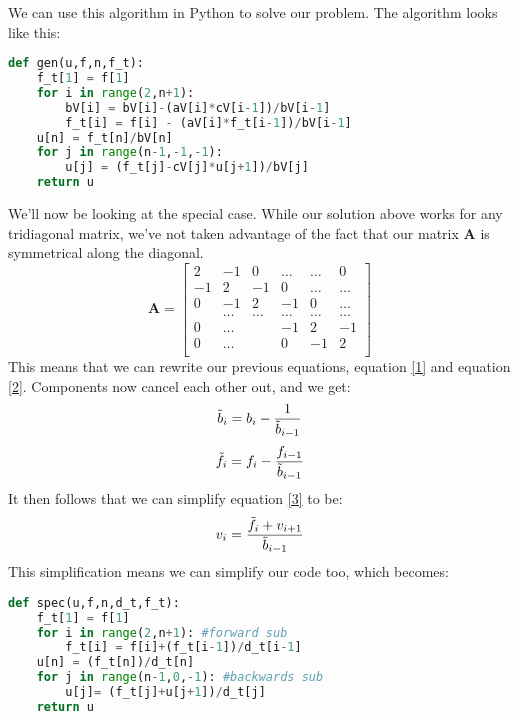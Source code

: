 \documentclass{article}
\begin{document}
We can use this algorithm in Python to solve our problem. The algorithm looks like this:
\begin{lstlisting}[language=Python]
def gen(u,f,n,f_t):
    f_t[1] = f[1]
    for i in range(2,n+1): 
        bV[i] = bV[i]-(aV[i]*cV[i-1])/bV[i-1]
        f_t[i] = f[i] - (aV[i]*f_t[i-1])/bV[i-1]
    u[n] = f_t[n]/bV[n]
    for j in range(n-1,-1,-1):
        u[j] = (f_t[j]-cV[j]*u[j+1])/bV[j]
    return u
\end{lstlisting}
We'll now be looking at the special case. While our solution above works for any tridiagonal matrix, we've not taken advantage of the fact that our matrix $\mathbf{A}$ is symmetrical along the diagonal.
\[
\mathbf{A} = \begin{bmatrix}
                           2& -1& 0 &\dots   & \dots &0 \\
                           -1 & 2 & -1 &0 &\dots &\dots \\
                           0&-1 &2 & -1 & 0 & \dots \\
                           & \dots   & \dots &\dots   &\dots & \dots \\
                           0&\dots   &  &-1 &2& -1 \\
                           0&\dots    &  & 0  &-1 & 2 \\
                      \end{bmatrix}
\]
This means that we can rewrite our previous equations, equation \ref{1} and equation \ref{2}.
Components now cancel each other out, and we get:
\begin{equation} \label{10}
    \Tilde{b}_{i}=b_i-\frac{1}{\Tilde{b}_{i-1}}
\end{equation}
\begin{equation} \label{11}
    \Tilde{f_i}=f_i-\frac{f_{i-1}}{\Tilde{b}_{i-1}}
\end{equation}
It then follows that we can simplify equation \ref{3} to be:
\begin{equation}
    v_i=\frac{\Tilde{f_i}+v_{i+1}}{\Tilde{b}_{i-1}}
\end{equation}
This simplification means we can simplify our code too, which becomes:
\begin{lstlisting}[language=Python]
def spec(u,f,n,d_t,f_t):
    f_t[1] = f[1]
    for i in range(2,n+1): #forward sub
        f_t[i] = f[i]+(f_t[i-1])/d_t[i-1]
    u[n] = (f_t[n])/d_t[n]
    for j in range(n-1,0,-1): #backwards sub
        u[j]= (f_t[j]+u[j+1])/d_t[j]
    return u
\end{lstlisting}
\end{document}
